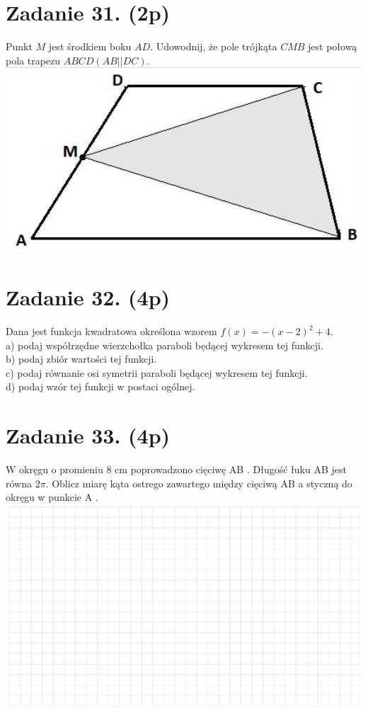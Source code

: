 \documentclass[10pt]{article}
\begin{document}
\section*{Zadanie 31. (2p)}
Punkt \(M\) jest środkiem boku \(A D\). Udowodnij, że pole trójkąta \(C M B\) jest połową pola trapezu \(A B C D(A B|\mid D C)\).\\
\includegraphics[max width=\textwidth, center]{2024_11_21_be8c615186155473dc68g-09}

\section*{Zadanie 32. (4p)}
Dana jest funkcja kwadratowa określona wzorem \(f(x)=-(x-2)^{2}+4\).\\
a) podaj współrzędne wierzchołka paraboli będącej wykresem tej funkcji.\\
b) podaj zbiór wartości tej funkcji.\\
c) podaj równanie osi symetrii paraboli będącej wykresem tej funkcji.\\
d) podaj wzór tej funkcji w postaci ogólnej.

\section*{Zadanie 33. (4p)}
W okręgu o promieniu 8 cm poprowadzono cięciwę AB . Długość łuku AB jest równa \(2 \pi\). Oblicz miarę kąta ostrego zawartego między cięciwą AB a styczną do okręgu w punkcie A .\\
\includegraphics[max width=\textwidth, center]{2024_11_21_be8c615186155473dc68g-10}
\end{document}
